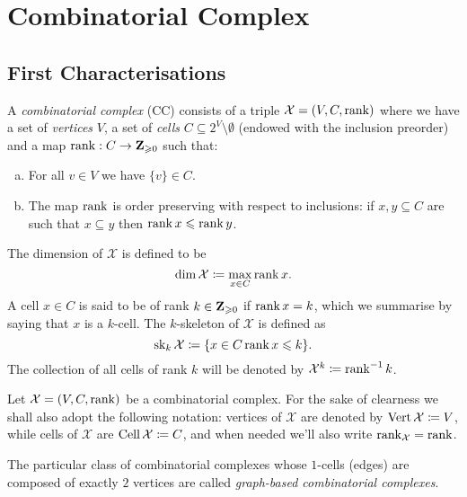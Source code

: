 \section{Combinatorial Complex}

\subsection{First Characterisations}

\begin{definition}
    \label{def:combinatorial-complex}
    A \emph{combinatorial complex} (CC) consists of a triple
    \(\mathcal{X} = (V, C, \operatorname{rank})\) where we have a set of \emph{vertices} \(V\), a set of
    \emph{cells} \(C \subseteq 2^V \setminus \emptyset\) (endowed with the inclusion preorder) and a map
    \(\operatorname{rank}: C \to \mathbf{Z}_{\geqslant 0}\) such that:
    \begin{enumerate}[(a)]\setlength\itemsep{0em}
        \item For all \(v \in V\) we have \(\{v\} \in C\).
        \item The map \(\operatorname{rank}\) is order preserving with respect to inclusions: if \(x,
              y \subseteq C\) are such that \(x \subseteq y\) then \(\operatorname{rank} x \leqslant \operatorname{rank} y\).
    \end{enumerate}
    The dimension of \(\mathcal{X}\) is defined to be
    \[
        \dim \mathcal{X} \coloneq \max_{x \in C} \operatorname{rank} x.
    \]
    A cell \(x \in C\) is said to be of rank \(k \in \mathbf{Z}_{\geqslant 0}\) if \(\operatorname{rank} x = k\), which we
    summarise by saying that \(x\) is a \(k\)-cell. The \(k\)-skeleton of \(\mathcal{X}\) is
    defined as
    \[
        \operatorname{sk}_k \mathcal{X} \coloneq \{x \in C \relax \operatorname{rank} x \leqslant k\}.
    \]
    The collection of all cells of rank \(k\) will be denoted by
    \(\mathcal{X}^k \coloneq \operatorname{rank}^{-1} k\).
\end{definition}

\begin{notation}
    \label{not:notation-combinatorial-complex}
    Let \(\mathcal X = (V, C, \operatorname{rank})\) be a combinatorial complex. For the sake of
    clearness we shall also adopt the following notation: vertices of
    \(\mathcal{X}\) are denoted by \(\operatorname{Vert} \mathcal{X} \coloneq V\), while cells of
    \(\mathcal{X}\) are \(\operatorname{Cell} \mathcal{X} \coloneq C\), and when needed we'll also write
    \(\operatorname{rank}_{\mathcal{X}} = \operatorname{rank}\).
\end{notation}

\begin{example}
    \label{exp:graph-based-cc}
    The particular class of combinatorial complexes whose \(1\)-cells (edges) are
    composed of exactly \(2\) vertices are called \emph{graph-based combinatorial
        complexes}.
\end{example}

